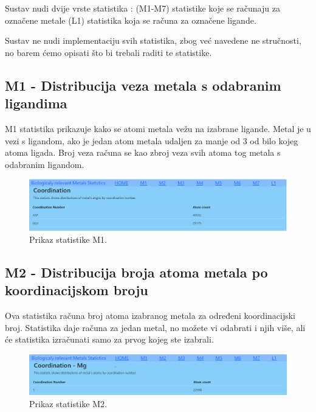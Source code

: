\documentclass[times, utf8, zavrsni]{fer}
\begin{document}
Sustav nudi dvije vrste statistika : (M1-M7) statistike koje se računaju za označene metale 
					 (L1) statistika koja se računa za označene ligande.

Sustav ne nudi implementaciju svih statistika, zbog već navedene ne stručnosti, no barem ćemo opisati što bi trebali raditi te statistike.

\subsection{M1 - Distribucija veza metala s odabranim ligandima}
M1 statistika prikazuje kako se atomi metala vežu na izabrane ligande.
Metal je u vezi s ligandom, ako je jedan atom metala udaljen za manje od 3 od bilo kojeg atoma ligada.
Broj veza računa se kao zbroj veza svih atoma tog metala s odabranim ligandom.

  \begin{figure}[!htb]
	\centering
	\hspace*{-2.5cm}
	 \includegraphics[width=\dimexpr\paperwidth-2cm,height=\paperheight,keepaspectratio]
	{./img/M1.png}
		\centering
                      \caption{Prikaz statistike M1.}
    \end{figure}


\subsection{M2 - Distribucija broja atoma metala po koordinacijskom broju }
Ova statistika računa broj atoma izabranog metala za određeni koordinacijski broj.
Statistika daje računa za jedan metal, no možete vi odabrati i njih više, ali će statistika izračunati samo za prvog kojeg ste izabrali.

\begin{figure}[!htb]
	\centering
	\hspace*{-2.5cm}
	 \includegraphics[width=\dimexpr\paperwidth-2cm,height=\paperheight,keepaspectratio]
	{./img/M2.png}
		\centering
                      \caption{Prikaz statistike M2.}
    \end{figure}
\end{document}
